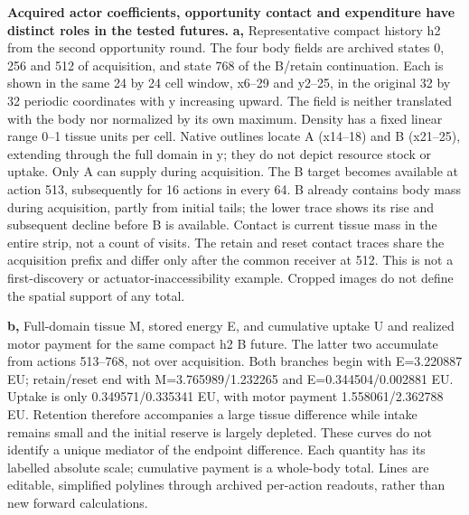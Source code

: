\textbf{Acquired actor coefficients, opportunity contact and expenditure have distinct roles in the tested futures.}
\textbf{a,} Representative compact history h2 from the second opportunity round. The four body fields are archived states 0, 256 and 512 of acquisition, and state 768 of the B/retain continuation. Each is shown in the same 24 by 24 cell window, x6--29 and y2--25, in the original 32 by 32 periodic coordinates with y increasing upward. The field is neither translated with the body nor normalized by its own maximum. Density has a fixed linear range 0--1 tissue units per cell. Native outlines locate A (x14--18) and B (x21--25), extending through the full domain in y; they do not depict resource stock or uptake. Only A can supply during acquisition. The B target becomes available at action 513, subsequently for 16 actions in every 64. B already contains body mass during acquisition, partly from initial tails; the lower trace shows its rise and subsequent decline before B is available. Contact is current tissue mass in the entire strip, not a count of visits. The retain and reset contact traces share the acquisition prefix and differ only after the common receiver at 512. This is not a first-discovery or actuator-inaccessibility example. Cropped images do not define the spatial support of any total.

\textbf{b,} Full-domain tissue M, stored energy E, and cumulative uptake U and realized motor payment for the same compact h2 B future. The latter two accumulate from actions 513--768, not over acquisition. Both branches begin with E=3.220887 EU; retain/reset end with M=3.765989/1.232265 and E=0.344504/0.002881 EU. Uptake is only 0.349571/0.335341 EU, with motor payment 1.558061/2.362788 EU. Retention therefore accompanies a large tissue difference while intake remains small and the initial reserve is largely depleted. These curves do not identify a unique mediator of the endpoint difference. Each quantity has its labelled absolute scale; cumulative payment is a whole-body total. Lines are editable, simplified polylines through archived per-action readouts, rather than new forward calculations.

